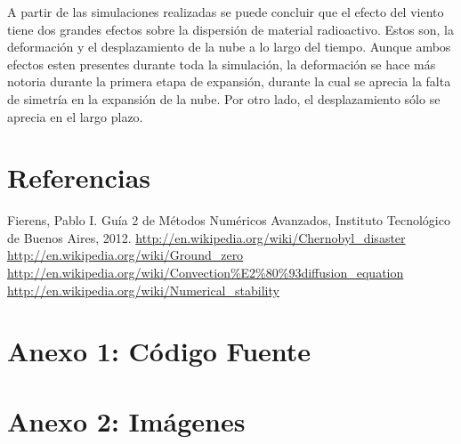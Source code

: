 \documentclass[twocolumn,a4paper,10pt]{article}
\begin{document}
A partir de las simulaciones realizadas se puede concluir que el efecto del viento tiene dos grandes efectos sobre la dispersi\'on de material radioactivo. Estos son, 
la deformaci\'on y el desplazamiento de la nube a lo largo del tiempo. Aunque ambos efectos esten presentes durante toda la simulaci\'on, la deformaci\'on se hace
m\'as notoria durante la primera etapa de expansi\'on, durante la cual se aprecia la falta de simetr\'ia en la expansi\'on de la nube. 
Por otro lado, el desplazamiento sólo se aprecia en el largo plazo.


\section*{Referencias}

\begin{thebibliography}{99}

     Fierens, Pablo I. Gu\'ia 2 de M\'etodos Num\'ericos Avanzados, Instituto Tecnol\'ogico de Buenos Aires, 2012.
     \url{http://en.wikipedia.org/wiki/Chernobyl_disaster}
     \url{http://en.wikipedia.org/wiki/Ground_zero}
     \url{http://en.wikipedia.org/wiki/Convection%E2%80%93diffusion_equation}
     \url{http://en.wikipedia.org/wiki/Numerical_stability}

\end{thebibliography}

\clearpage
\section*{Anexo 1: C\'odigo Fuente}

    
    

\clearpage
\section*{Anexo 2: Im\'agenes}
\end{document}
